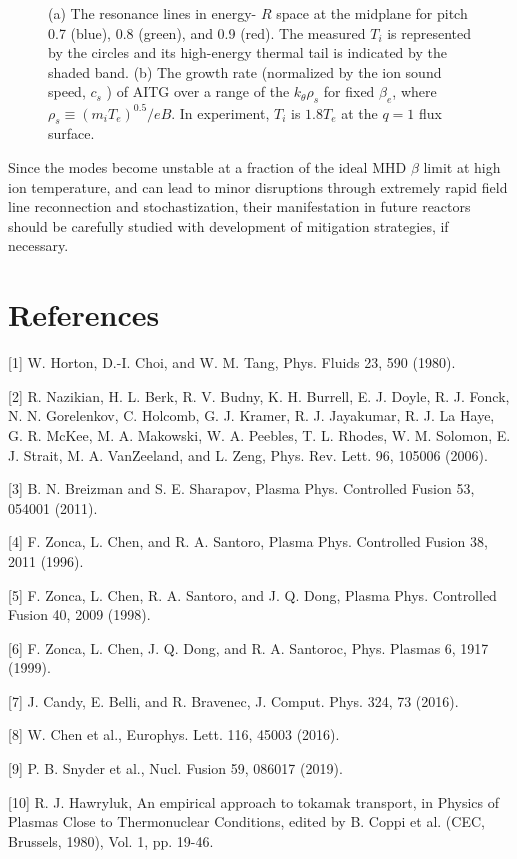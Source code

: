 \documentclass[oneside,onecolumn]{article}
\begin{document}
\begin{sloppypar}
\begin{figure}[htbp]
 	\caption{(a) The resonance lines in energy- $R$ space at the midplane for pitch 0.7 (blue), 0.8 (green), and 0.9 (red). The measured $T_{i}$ is represented by the circles and its high-energy thermal tail is indicated by the shaded band. (b) The growth rate (normalized by the ion sound speed, $c_{s}$ ) of AITG over a range of the $k_{\theta} \rho_{s}$ for fixed $\beta_{e}$, where $\rho_{s} \equiv\left(m_{i} T_{e}\right)^{0.5} / e B$. In experiment, $T_{i}$ is $1.8 T_{e}$ at the $q=1$ flux surface.}
 	\label{figure6}
 \end{figure}
 
 
 Since the modes become unstable at a fraction of the ideal MHD $\beta$ limit at high ion temperature, and can lead to minor disruptions through extremely rapid field line reconnection and stochastization, their manifestation in future reactors should be carefully studied with development of mitigation strategies, if necessary. 
 
 \clearpage
 \section*{References}
 [1] W. Horton, D.-I. Choi, and W. M. Tang, Phys. Fluids 23, 590 (1980).
 
 [2] R. Nazikian, H. L. Berk, R. V. Budny, K. H. Burrell, E. J. Doyle, R. J. Fonck, N. N. Gorelenkov, C. Holcomb, G. J. Kramer, R. J. Jayakumar, R. J. La Haye, G. R. McKee, M. A. Makowski, W. A. Peebles, T. L. Rhodes, W. M. Solomon, E. J. Strait, M. A. VanZeeland, and L. Zeng, Phys. Rev. Lett. 96, 105006 (2006).
 
 [3] B. N. Breizman and S. E. Sharapov, Plasma Phys. Controlled Fusion 53, 054001 (2011).
 
 [4] F. Zonca, L. Chen, and R. A. Santoro, Plasma Phys. Controlled Fusion 38, 2011 (1996).
 
 [5] F. Zonca, L. Chen, R. A. Santoro, and J. Q. Dong, Plasma Phys. Controlled Fusion 40, 2009 (1998).
 
 [6] F. Zonca, L. Chen, J. Q. Dong, and R. A. Santoroc, Phys. Plasmas 6, 1917 (1999).
 
 [7] J. Candy, E. Belli, and R. Bravenec, J. Comput. Phys. 324, 73 (2016).
 
 [8] W. Chen et al., Europhys. Lett. 116, 45003 (2016).
 
 [9] P. B. Snyder et al., Nucl. Fusion 59, 086017 (2019).
 
 [10] R. J. Hawryluk, An empirical approach to tokamak transport, in Physics of Plasmas Close to Thermonuclear Conditions, edited by B. Coppi et al. (CEC, Brussels, 1980), Vol. 1, pp. 19-46.
 

\end{sloppypar}
\end{document}
